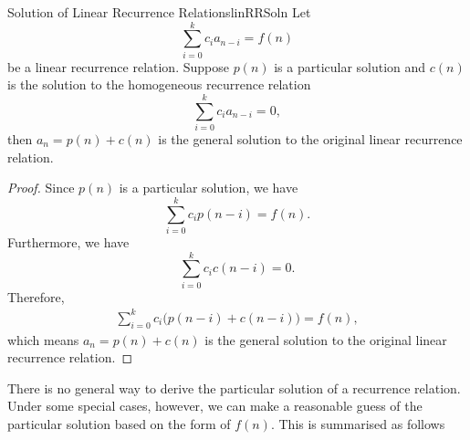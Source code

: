 \documentclass[math]{amznotes}
\theoremstyle{remark}
\begin{document}
\begin{thmbox}{Solution of Linear Recurrence Relations}{linRRSoln}
    Let
    \begin{equation*}
        \sum_{i = 0}^{k}c_ia_{n - i} = f(n)
    \end{equation*}
    be a linear recurrence relation. Suppose $p(n)$ is a particular solution and $c(n)$ is the solution to the homogeneous recurrence relation
    \begin{equation*}
        \sum_{i = 0}^{k}c_ia_{n - i} = 0,
    \end{equation*}
    then $a_n = p(n) + c(n)$ is the general solution to the original linear recurrence relation.
    \tcblower
    \begin{proof}
        Since $p(n)$ is a particular solution, we have 
        \begin{equation*}
            \sum_{i = 0}^{k}c_ip(n - i) = f(n).
        \end{equation*}
        Furthermore, we have
        \begin{equation*}
            \sum_{i = 0}^{k}c_ic(n - i) = 0.
        \end{equation*}
        Therefore,
        \begin{align*}
            \sum_{i = 0}^{k}c_i\bigl(p(n - i) + c(n - i)\bigr) = f(n),
        \end{align*}
        which means $a_n = p(n) + c(n)$ is the general solution to the original linear recurrence relation.
    \end{proof}
\end{thmbox}
There is no general way to derive the particular solution of a recurrence relation. Under some special cases, however, we can make a reasonable guess of the particular solution based on the form of $f(n)$. This is summarised as follows
\end{document}
